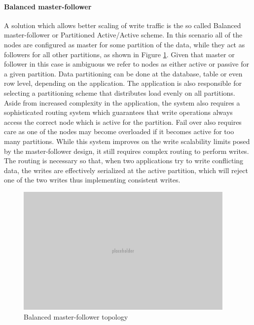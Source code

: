\paragraph{Balanced master-follower}
A solution which allows better scaling of write traffic is the so called Balanced master-follower or Partitioned Active/Active scheme.
In this scenario all of the nodes are configured as master for some partition of the data, while they act as followers for all other partitions, as shown in Figure \ref{fig:balanced-master-follower}.
Given that master or follower in this case is ambiguous we refer to nodes as either active or passive for a given partition.
Data partitioning can be done at the database, table or even row level, depending on the application.
The application is also responsible for selecting a partitioning scheme that distributes load evenly on all partitions.
Aside from increased complexity in the application, the system also requires a sophisticated routing system which guarantees that write operations always access the correct node which is active for the partition.
Fail over also requires care as one of the nodes may become overloaded if it becomes active for too many partitions.
While this system improves on the write scalability limits posed by the master-follower design, it still requires complex routing to perform writes.
The routing is necessary so that, when two applications try to write conflicting data, the writes are effectively serialized at the active partition, which will reject one of the two writes thus implementing consistent writes.

\begin{figure}[h]
\caption{Balanced master-follower topology}
\label{fig:balanced-master-follower}
\centering
\includegraphics[width=0.95\textwidth]{images/placeholder.png}
\end{figure}

